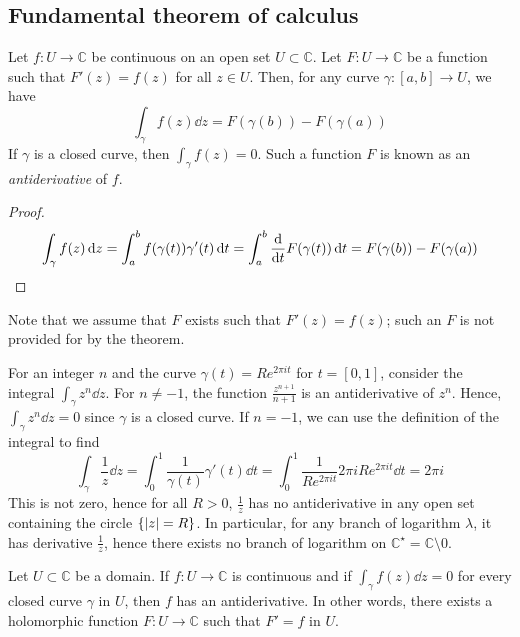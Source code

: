 \subsection{Fundamental theorem of calculus}
\begin{theorem}
	Let \( f \colon U \to \mathbb C \) be continuous on an open set \( U \subset \mathbb C \).
	Let \( F \colon U \to \mathbb C \) be a function such that \( F'(z) = f(z) \) for all \( z \in U \).
	Then, for any curve \( \gamma \colon [a,b] \to U \), we have
	\[
		\int_\gamma f(z) \dd{z} = F(\gamma(b)) - F(\gamma(a))
	\]
	If \( \gamma \) is a closed curve, then \( \int_\gamma f(z) = 0 \).
	Such a function \( F \) is known as an \textit{antiderivative} of \( f \).
\end{theorem}
\begin{proof}
	\[
		\int_\gamma f(z) \dd{z} = \int_a^b f(\gamma(t)) \gamma'(t) \dd{t} = \int_a^b \dv{t} F(\gamma(t)) \dd{t} = F(\gamma(b)) - F(\gamma(a))
	\]
\end{proof}
\begin{remark}
	Note that we assume that \( F \) exists such that \( F'(z) = f(z) \); such an \( F \) is not provided for by the theorem.
\end{remark}
\begin{example}
	For an integer \( n \) and the curve \( \gamma(t) = Re^{2\pi it} \) for \( t = [0,1] \), consider the integral \( \int_\gamma z^n \dd{z} \).
	For \( n \neq -1 \), the function \( \frac{z^{n+1}}{n+1} \) is an antiderivative of \( z^n \).
	Hence, \( \int_\gamma z^n \dd{z} = 0 \) since \( \gamma \) is a closed curve.
	If \( n = -1 \), we can use the definition of the integral to find
	\[
		\int_\gamma \frac{1}{z} \dd{z} = \int_0^1 \frac{1}{\gamma(t)} \gamma'(t) \dd{t} = \int_0^1 \frac{1}{Re^{2\pi i t}}2\pi i R e^{2 \pi i t} \dd{t} = 2 \pi i
	\]
	This is not zero, hence for all \( R > 0 \), \( \frac{1}{z} \) has no antiderivative in any open set containing the circle \( \qty{\abs{z} = R} \).
	In particular, for any branch of logarithm \( \lambda \), it has derivative \( \frac{1}{z} \), hence there exists no branch of logarithm on \( \mathbb C^\star = \mathbb C \setminus \qty{0} \).
\end{example}
\begin{theorem}
	Let \( U \subset \mathbb C \) be a domain.
	If \( f \colon U \to \mathbb C \) is continuous and if \( \int_\gamma f(z) \dd{z} = 0 \) for every closed curve \( \gamma \) in \( U \), then \( f \) has an antiderivative.
	In other words, there exists a holomorphic function \( F \colon U \to \mathbb C \) such that \( F' = f \) in \( U \).
\end{theorem}
